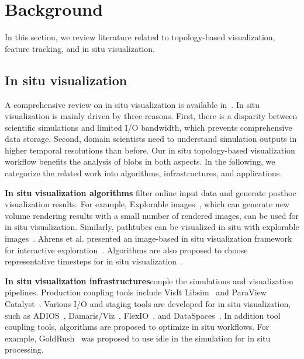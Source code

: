 \section{Background}
\label{sec:related}

In this section, we review literature related to topology-based visualization, feature tracking, and in situ visualization.  


\subsection{In situ visualization}

A comprehensive review on in situ visualization is available in~\cite{BauerAACGKMLVWB16}.  In situ visualization is mainly driven by three reasons.  First, there is a disparity between scientific simulations and limited I/O bandwidth, which prevents comprehensive data storage.  Second, domain scientists need to understand simulation outputs in higher temporal resolutions than before.  Our in situ topology-based visualization workflow benefits the analysis of blobs in both aspects.  In the following, we categorize the related work into algorithms, infrastructures, and applications.  

{\bf In situ visualization algorithms} filter online input data and generate posthoc visualization results.  For example, Explorable images~\cite{TikhonovaCM2010}, which can generate new volume rendering results with a small number of rendered images, can be used for in situ visualization.  Similarly, pathtubes can be visualized in situ with explorable images~\cite{YeMM13}.  Ahrens et al. presented an image-based in situ visualization framework for interactive exploration~\cite{AhrensJOPRP14}.  Algorithms are also proposed to choose representative timesteps for in situ visualization~\cite{MalakarVMKHLP15}.  

{\bf In situ visualization infrastructures}\qquad couple the simulations and visualization pipelines.  Production coupling tools include VisIt Libsim~\cite{WhitlockFM11} and ParaView Catalyst~\cite{FabianMTBMGRJ11}.  
Various I/O and staging tools are developed for in situ visualization, such as ADIOS~\cite{LofsteadZKS09}, Damaris/Viz~\cite{DorierSPAS13}, FlexIO~\cite{ZhengZESWDNCAKPY13}, and DataSpaces~\cite{DocanPK12}.  
In addition tool coupling tools, algorithms are proposed to optimize in situ workflows.  For example, GoldRush~\cite{ZhengYHWESAK13} was proposed to use idle in the simulation for in situ processing.  


